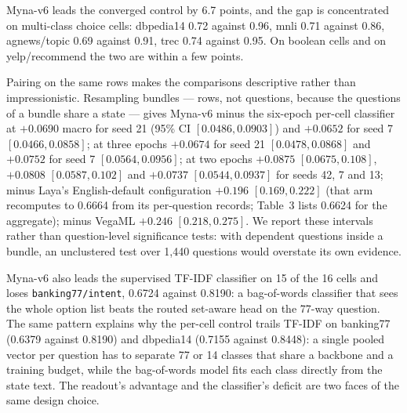 \documentclass[11pt]{article}
\begin{document}
Myna-v6{} leads the converged control by 6.7 points, and the gap is concentrated on multi-class choice
cells: dbpedia14 0.72 against 0.96, mnli 0.71 against 0.86, agnews/topic 0.69 against 0.91, trec
0.74 against 0.95. On boolean cells and on yelp/recommend the two are within a few points.

Pairing on the same rows makes the comparisons descriptive rather than impressionistic. Resampling
bundles --- rows, not questions, because the questions of a bundle share a state --- gives Myna-v6{}
minus the six-epoch per-cell classifier at $+0.0690$ macro for seed 21 (95\% CI $[0.0486,0.0903]$)
and $+0.0652$ for seed 7 $[0.0466,0.0858]$; at three
epochs $+0.0674$ for seed 21 $[0.0478,0.0868]$ and $+0.0752$ for seed 7 $[0.0564,0.0956]$; at two
epochs $+0.0875$ $[0.0675,0.108]$, $+0.0808$ $[0.0587,0.102]$ and $+0.0737$ $[0.0544,0.0937]$ for
seeds 42, 7 and 13; minus Laya's English-default configuration $+0.196$ $[0.169,0.222]$ (that arm recomputes to
0.6664 from its per-question records; Table~3 lists 0.6624 for the aggregate);
minus VegaML $+0.246$ $[0.218,0.275]$. We report these intervals rather than question-level
significance tests: with dependent questions inside a bundle, an unclustered test over 1{,}440
questions would overstate its own evidence.

Myna-v6{} also leads the supervised TF-IDF classifier on 15 of the 16 cells and loses
\texttt{banking77/intent}, 0.6724 against 0.8190: a bag-of-words classifier that sees the whole
option list beats the routed set-aware head on the 77-way question. The same pattern explains why the
per-cell control trails TF-IDF on banking77 (0.6379 against 0.8190) and dbpedia14 (0.7155 against
0.8448): a single pooled vector per question has to separate 77 or 14 classes that share a
backbone and a training budget, while the bag-of-words model fits each class directly from the state
text. The readout's advantage and the classifier's deficit are two faces of the same design choice.
\end{document}
